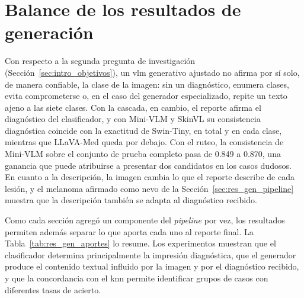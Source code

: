 \section{Balance de los resultados de generación}
\label{sec:res_gen_discusion}

Con respecto a la segunda pregunta de investigación (Sección~\ref{sec:intro_objetivos}), un \gls{vlm} generativo
ajustado no afirma por sí solo, de manera confiable, la clase de la imagen: sin un diagnóstico, enumera clases, evita comprometerse o, en el
caso del generador especializado, repite un texto ajeno a las siete clases. Con la cascada, en cambio, el reporte
afirma el diagnóstico del clasificador, y con Mini-VLM y SkinVL su consistencia diagnóstica coincide con la exactitud
de Swin-Tiny, en total y en cada clase, mientras que LLaVA-Med queda por debajo. Con el ruteo, la consistencia de
Mini-VLM sobre el conjunto de prueba completo pasa de 0.849 a 0.870, una ganancia que puede atribuirse a presentar dos candidatos en los
casos dudosos. En cuanto a la descripción, la imagen cambia lo que el reporte describe de cada lesión, y el melanoma afirmado como nevo de la Sección~\ref{sec:res_gen_pipeline}
muestra que la descripción también se adapta al diagnóstico recibido.

Como cada sección agregó un componente del \emph{pipeline} por vez, los resultados permiten además separar lo que
aporta cada uno al reporte final. La Tabla~\ref{tab:res_gen_aportes} lo resume. Los experimentos muestran que el clasificador determina principalmente la impresión diagnóstica, que el generador produce el contenido textual influido por la imagen y por el diagnóstico recibido, y que la concordancia con el \gls{knn} permite identificar grupos de casos con diferentes tasas de acierto.

